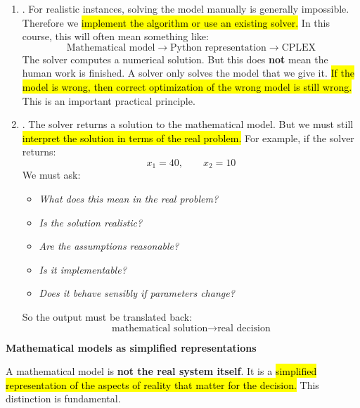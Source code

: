 \begin{enumerate}
    \item {}. For realistic instances, solving the model manually is generally impossible. Therefore we \hl{implement the algorithm or use an existing solver.} In this course, this will often mean something like:
        \begin{equation*}
            \text{Mathematical model} \to \text{Python representation} \to \text{CPLEX}
        \end{equation*}
        The solver computes a numerical solution. But this does \textbf{not} mean the human work is finished. A solver only solves the model that we give it. \hl{If the model is wrong, then correct optimization of the wrong model is still wrong.} This is an important practical principle.

    \item {}. The solver returns a solution to the mathematical model. But we must still \hl{interpret the solution in terms of the real problem.} For example, if the solver returns:
        \begin{equation*}
            x_1=40,\qquad x_2=10
        \end{equation*}
        We must ask:
        \begin{itemize}
            \item \emph{What does this mean in the real problem?}
            \item \emph{Is the solution realistic?}
            \item \emph{Are the assumptions reasonable?}
            \item \emph{Is it implementable?}
            \item \emph{Does it behave sensibly if parameters change?}
        \end{itemize}
        So the output must be translated back:
        \begin{equation*}
            \text{mathematical solution}
            \rightarrow
            \text{real decision}
        \end{equation*}
\end{enumerate}

\highspace
\begin{flushleft}
    \textcolor{Green3}{ \textbf{Mathematical models as simplified representations}}
\end{flushleft}
A mathematical model is \textbf{not the real system itself}. It is a \hl{simplified representation of the aspects of reality that matter for the decision.} This distinction is fundamental.

